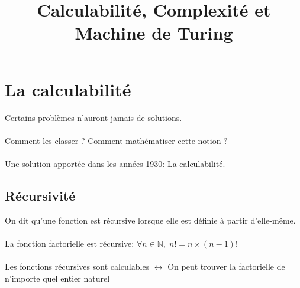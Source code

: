 \documentclass[12pt]{article}   %
\title{Calculabilité, Complexité et Machine de Turing}    %
\date{ }
\begin{document}
\pagestyle{empty}
\maketitle
\renewcommand{\contentsname}{Sommaire}   %
\Large{\tableofcontents}								%
\large
\thispagestyle{empty}
\newpage											%






\section{La calculabilité}     %
Certains problèmes n'auront jamais de solutions.\\\\Comment les classer ?   Comment mathématiser cette notion ?\\ \\Une solution apportée dans les années 1930: La calculabilité.

\subsection{Récursivité}
On dit qu'une fonction est récursive lorsque elle est définie à partir d'elle-même.
\\ \\ La fonction factorielle est récursive: 
\begin{math} \forall n\in \mathbb{N},\;  n!=n\times(n-1)! \end {math}
\\\\
Les fonctions récursives sont calculables \begin{math}\leftrightarrow\end{math} On peut trouver la factorielle de n'importe quel entier naturel
\end{document}
